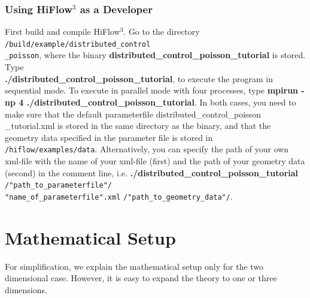 \documentclass[a4paper, 11pt, twoside]{article}
\begin{document}
\subsubsection{Using HiFlow$^3$ as a Developer}\label{sectiondeveloper}
First build and compile HiFlow$^3$. Go to the directory \verb'/build/example/distributed_control'\\ \verb'_poisson', where the binary \textbf{distributed\_control\_poisson\_tutorial} is stored. Type \\ \textbf{./distributed\_control\_poisson\_tutorial}, to execute the program in sequential mode. To execute in parallel mode  with four processes, type \textbf{mpirun -np 4 ./distributed\_control\_poisson\_tutorial}. In both cases, you need to make sure that the default parameterfile distributed\_control\_poisson\ \\ \_tutorial.xml is stored in the same directory as the binary, and that the geometry data specified in the parameter file is stored in \verb'/hiflow/examples/data'. Alternatively, you can specify the path of your own xml-file with the name of your xml-file (first) and the path of your geometry data (second) in the comment line, i.e. \textbf{./distributed\_control\_poisson\_tutorial} \verb'/"path_to_parameterfile"/'\\ \verb'"name_of_parameterfile".xml' \verb'/"path_to_geometry_data"/'.


\section{Mathematical Setup}
For simplification, we explain the mathematical setup only for the two dimensional case. However, it is easy to expand the theory to one or three dimensions. \\
\end{document}
